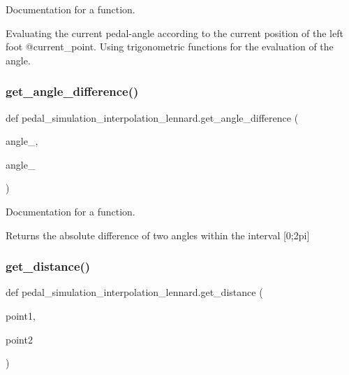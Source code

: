 Documentation for a function. 

Evaluating the current pedal-\/angle according to the current position of the left foot @current\+\_\+point. Using trigonometric functions for the evaluation of the angle. \mbox{\label{namespacepedal__simulation__interpolation__lennard_ae98aebfd88ca1ccae8edacb3b860c21a}} 
\subsubsection{\texorpdfstring{get\_angle\_difference()}{get\_angle\_difference()}}
{\footnotesize\ttfamily def pedal\+\_\+simulation\+\_\+interpolation\+\_\+lennard.\+get\+\_\+angle\+\_\+difference (\begin{DoxyParamCaption}\item[{}]{angle\+\_,  }\item[{}]{angle\+\_ }\end{DoxyParamCaption})}



Documentation for a function. 

Returns the absolute difference of two angles within the interval \mbox{[}0;2pi\mbox{]} \mbox{\label{namespacepedal__simulation__interpolation__lennard_a5344f8d2cb5cfc7eb12ef8bd1c1ae9a4}} 
\subsubsection{\texorpdfstring{get\_distance()}{get\_distance()}}
{\footnotesize\ttfamily def pedal\+\_\+simulation\+\_\+interpolation\+\_\+lennard.\+get\+\_\+distance (\begin{DoxyParamCaption}\item[{}]{point1,  }\item[{}]{point2 }\end{DoxyParamCaption})}



